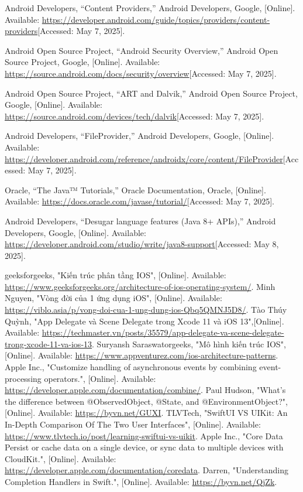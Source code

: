 \documentclass[12pt]{report}
\begin{document}
\begin{thebibliography}{1}
  Android Developers, “Content Providers,” Android Developers, Google, [Online]. Available: \url{https://developer.android.com/guide/topics/providers/content-providers}[Accessed: May 7, 2025].
  
  Android Open Source Project, “Android Security Overview,” Android Open Source Project, Google, [Online]. Available: \url{https://source.android.com/docs/security/overview}[Accessed: May 7, 2025].
 
  Android Open Source Project, “ART and Dalvik,” Android Open Source Project, Google, [Online]. Available: \url{https://source.android.com/devices/tech/dalvik}[Accessed: May 7, 2025].
 
  Android Developers, “FileProvider,” Android Developers, Google, [Online]. Available: \url{https://developer.android.com/reference/androidx/core/content/FileProvider}[Accessed: May 7, 2025].
 
  Oracle, “The Java™ Tutorials,” Oracle Documentation, Oracle, [Online]. Available: \url{https://docs.oracle.com/javase/tutorial/}[Accessed: May 7, 2025].
 
  Android Developers, “Desugar language features (Java 8+ APIs),” Android Developers, Google, [Online]. Available: \url{https://developer.android.com/studio/write/java8-support}[Accessed: May 8, 2025].
 
  
 geeksforgeeks, "Kiến trúc phân tầng IOS", [Online]. Available: \url{https://www.geeksforgeeks.org/architecture-of-ios-operating-system/}.
  Minh Nguyen, "Vòng đời của 1 ứng dụng iOS", [Online]. Available: \url{https://viblo.asia/p/vong-doi-cua-1-ung-dung-ios-Qbq5QMNJ5D8/}.
Tào Thúy Quỳnh, "App Delegate và Scene Delegate trong Xcode 11 và iOS 13",[Online]. Available: \url{https://techmaster.vn/posts/35579/app-delegate-va-scene-delegate-trong-xcode-11-va-ios-13}.
Suryansh Saraswatorgeeks, "Mô hình kiến trúc IOS", [Online]. Available: \url{https://www.appventurez.com/ios-architecture-patterns}.
Apple Inc., "Customize handling of asynchronous events by combining event-processing operators.", [Online]. Available: \url{https://developer.apple.com/documentation/combine/}.
 Paul Hudson, "What’s the difference between @ObservedObject, @State, and @EnvironmentObject?", [Online]. Available: \url{https://byvn.net/GUXI}.
 TLVTech, "SwiftUI VS UIKit: An In-Depth Comparison Of The Two User Interfaces", [Online]. Available: \url{https://www.tlvtech.io/post/learning-swiftui-vs-uikit}.
 Apple Inc., "Core Data Persist or cache data on a single device, or sync data to multiple devices with CloudKit.", [Online]. Available: \url{https://developer.apple.com/documentation/coredata}.
 Darren, "Understanding Completion Handlers in Swift.", [Online]. Available: \url{https://byvn.net/QjZk}.


\end{thebibliography}
\end{document}
